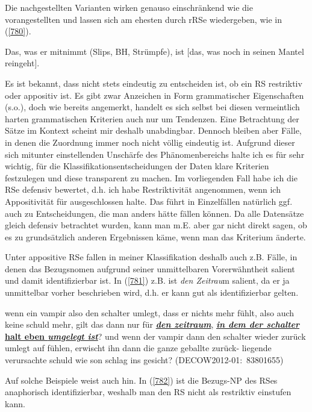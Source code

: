 Die nachgestellten Varianten wirken genauso einschränkend wie die vorange\-stellten und lassen sich am ehesten durch rRSe wiedergeben, wie in (\ref{780}).

\begin{exe}
	\ex\label{780} 
	Das, was er mitnimmt (Slips, BH, Strümpfe), ist $[$das, was noch in seinen Mantel reingeht$]$.
\end{exe}
Es ist bekannt, dass nicht stets eindeutig zu entscheiden ist, ob ein RS restriktiv oder appositiv ist. Es gibt zwar Anzeichen in Form grammatischer Eigenschaften (s.o.), doch wie bereits angemerkt, handelt es sich selbst bei diesen vermeintlich \glq  harten\grq {} grammatischen Kriterien auch nur um Tendenzen. Eine Betrachtung der Sätze im Kontext scheint mir deshalb unabdingbar. Dennoch bleiben aber Fälle, in denen die Zuordnung immer noch nicht völlig eindeutig ist. Aufgrund dieser sich mitunter einstellenden Unschärfe des Phänomenbereichs halte ich es für sehr wichtig, für die Klassifikationsentscheidungen der Daten klare Kriterien festzulegen und diese transparent zu machen. Im vorliegenden Fall habe ich die RSe defensiv bewertet, d.h. ich habe Restriktivität angenommen, wenn ich Appositivität für ausge\-schlossen halte. Das führt in Einzelfällen natürlich ggf. auch zu Entscheidungen, die man anders hätte fällen können. Da alle Datensätze \\ gleich defensiv betrachtet wurden, kann man m.E. aber gar nicht direkt sagen, ob es zu grundsätzlich anderen Ergebnissen käme, wenn man das Kriterium änderte.

Unter appositive RSe fallen in meiner Klassifikation deshalb auch z.B. Fälle, in denen das Bezugsnomen aufgrund seiner unmittelbaren Vorerwähntheit salient und damit identifizierbar ist. In (\ref{781}) z.B. ist \textit{den Zeitrau}m salient, da er ja unmittelbar vorher beschrieben wird, d.h. er kann gut als identifizierbar gelten.
	
\begin{exe}
	\ex\label{781} 
	\scriptsize
	wenn ein vampir also den schalter umlegt, dass er nichts mehr fühlt, also auch keine schuld mehr, gilt das dann nur für 		\underline{\textbf{\textit{den zeitraum}}}, \underline{\textbf{\textit{in dem der schalter} halt eben \textit{umgelegt 			ist}}}? und wenn der vampir dann den schalter wieder zurück umlegt auf fühlen, erwischt ihn dann die ganze geballte zurück-		liegende verursachte schuld wie son schlag ins gesicht?                  
	\hfill\hbox {(DECOW2012-01: 83801655)}
\end{exe}	       
Auf solche Beispiele weist auch \citet[115]{Mikame1998} hin. In (\ref{782}) ist die Bezugs-NP des RSes anaphorisch identifizierbar, weshalb man den RS nicht als restriktiv einstufen kann.
	
